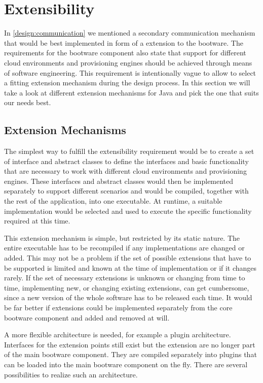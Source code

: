 \section{Extensibility}
\label{design:extensibility}

In \autoref{design:communication} we mentioned a secondary communication mechanism that would be best implemented in form of a extension to the bootware.
The requirements for the bootware component also state that support for different cloud environments and provisioning engines should be achieved through means of software engineering.
This requirement is intentionally vague to allow to select a fitting extension mechanism during the design process.
In this section we will take a look at different extension mechanisms for Java and pick the one that suits our needs best.

\subsection{Extension Mechanisms}

The simplest way to fulfill the extensibility requirement would be to create a set of interface and abstract classes to define the interfaces and basic functionality that are necessary to work with different cloud environments and provisioning engines.
These interfaces and abstract classes would then be implemented separately to support different scenarios and would be compiled, together with the rest of the application, into one executable.
At runtime, a suitable implementation would be selected and used to execute the specific functionality required at this time.

This extension mechanism is simple, but restricted by its static nature.
The entire executable has to be recompiled if any implementations are changed or added.
This may not be a problem if the set of possible extensions that have to be supported is limited and known at the time of implementation or if it changes rarely.
If the set of necessary extensions is unknown or changing from time to time, implementing new, or changing existing extensions, can get cumbersome, since a new version of the whole software has to be released each time.
It would be far better if extensions could be implemented separately from the core bootware component and added and removed at will.

A more flexible architecture is needed, for example a plugin architecture.
Interfaces for the extension points still exist but the extension are no longer part of the main bootware component.
They are compiled separately into plugins that can be loaded into the main bootware component on the fly.
There are several possibilities to realize such an architecture.

